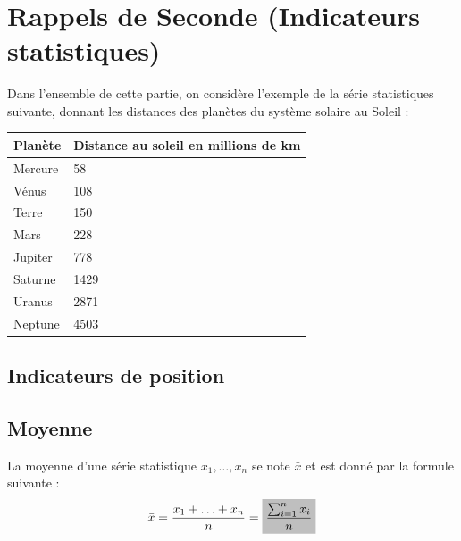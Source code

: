 \documentclass[12pt]{article}
\title{
  \vspace{4em}
  \centering
  \tcbset{colframe=BlackSav,colback=GrayBG}
  \tcbox[tikznode]{
    Chapitre 11 \\Variables aléatoires
  }
}
\author{}
\date{}
\theoremstyle{break}
\begin{document}
\maketitle

\tableofcontents

\newcommand{\hideM}[1]{\mbox{\vphantom{$#1$}\smash{\colorbox{gray!50}{$\displaystyle #1$}}} }
\newcommand{\hide}[1]{\mbox{\vphantom{#1}\smash{\colorbox{gray!50}{#1}}}}

\newpage

\section{Rappels de Seconde (Indicateurs statistiques)}
Dans l'ensemble de cette partie, on considère l'exemple de la série statistiques suivante, donnant les distances des planètes du système solaire au Soleil :

\begin{center}
  \begin{tabular}{|l|l|}
    \hline
    Planète & Distance au soleil en millions de km \\
    \hline
    Mercure & 58 \\
    \hline
    Vénus & 108 \\
    \hline
    Terre & 150 \\
    \hline
    Mars & 228 \\
    \hline
    Jupiter & 778 \\
    \hline
    Saturne & 1429 \\
    \hline
    Uranus & 2871 \\
    \hline
    Neptune & 4503 \\
    \hline
  \end{tabular}
\end{center}

\subsection{Indicateurs de position}
\subsection{Moyenne}
\begin{definition}{}{}
  La moyenne d'une série statistique $x_{1}, \ldots, x_{n}$ se note $\bar{x}$ et est donné par la formule suivante :

  $$
  \bar{x}=\frac{x_{1}+\ldots+x_{n}}{n}=\hideM{\frac{\sum_{i=1}^{n} x_{i}}{n}}
  $$
\end{definition}
\end{document}
